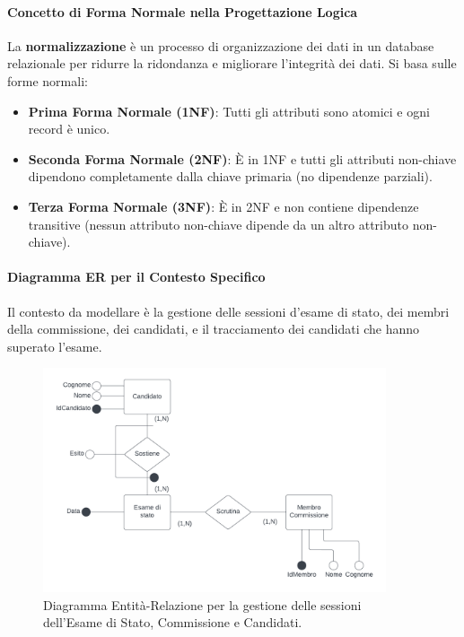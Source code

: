 \paragraph{Concetto di Forma Normale nella Progettazione Logica}
La \textbf{normalizzazione} è un processo di organizzazione dei dati in un database relazionale per ridurre la ridondanza e migliorare l'integrità dei dati. Si basa sulle forme normali:
\begin{itemize}
    \item \textbf{Prima Forma Normale (1NF)}: Tutti gli attributi sono atomici e ogni record è unico.
    \item \textbf{Seconda Forma Normale (2NF)}: È in 1NF e tutti gli attributi non-chiave dipendono completamente dalla chiave primaria (no dipendenze parziali).
    \item \textbf{Terza Forma Normale (3NF)}: È in 2NF e non contiene dipendenze transitive (nessun attributo non-chiave dipende da un altro attributo non-chiave).
\end{itemize}

\paragraph{Diagramma ER per il Contesto Specifico}
Il contesto da modellare è la gestione delle sessioni d'esame di stato, dei membri della commissione, dei candidati, e il tracciamento dei candidati che hanno superato l'esame.

\begin{figure}[h!]
    \centering
    \includegraphics[width=0.9\textwidth]{capitoli/basi_di_dati/domande_teoriche/immagini/er_esame_stato_commissione_candidati.png}
    \caption{Diagramma Entità-Relazione per la gestione delle sessioni dell'Esame di Stato, Commissione e Candidati.}
    \label{fig:er_esame_stato_commissione_candidati}
\end{figure}

